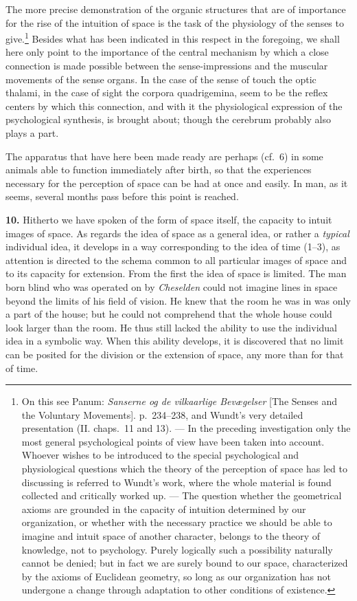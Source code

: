 \documentclass[12pt,a4paper]{book}
\newcommand{\opage}[1]{\marginnote{\footnotesize\textit{[#1]}}}
\begin{document}
The more precise demonstration of the organic structures that are of
importance for the rise of the intuition of space is the task of the
physiology of the senses to
give.\footnote{On this see Panum: \textit{Sanserne og de vilkaarlige
Bevægelser} [The Senses and the Voluntary Movements]. p.~234--238, and
Wundt's very detailed presentation (II. chaps.~11 and 13). --- In the
preceding investigation only the most general psychological points of
view have been taken into account. Whoever wishes to be introduced to
the special psychological and physiological questions which the theory of
the perception of space has led to discussing is referred to Wundt's
work, where the whole material is found collected and critically worked
up. --- The question whether the geometrical axioms are grounded in the
capacity of intuition determined by our organization, or whether with
the necessary practice we should be able to imagine and intuit space of
another character, belongs to the theory of knowledge, not to
psychology. Purely logically such a possibility naturally cannot be
denied; but in fact we are surely bound to our space, characterized by
the axioms of Euclidean geometry, so long as our organization has not
undergone a change through adaptation to other conditions of
existence.} Besides what has been indicated in this
\opage{250}respect in the foregoing, we shall here only point to the
importance of the central mechanism by which a close connection is made
possible between the sense-impressions and the muscular movements of the
sense organs. In the case of the sense of touch the optic thalami, in the
case of sight the corpora quadrigemina, seem to be the reflex centers by
which this connection, and with it the physiological expression of the
psychological synthesis, is brought about; though the cerebrum probably
also plays a part.

The apparatus that have here been made ready are perhaps (cf.\ 6) in some
animals able to function immediately after birth, so that the
experiences necessary for the perception of space can be had at once and
easily. In man, as it seems, several months pass before this point is
reached.

\textbf{10.} Hitherto we have spoken of the form of space itself, the
capacity to intuit images of space. As regards the idea of space as a
general idea, or rather a \emph{typical} individual idea, it develops in
a way corresponding to the idea of time (1--3), as attention is directed
to the schema common to all particular images of space and to its
capacity for extension. From the first the idea of space is limited. The
man born blind who was operated on by \emph{Cheselden} could not imagine
lines in space beyond the limits of his field of vision. He knew that the
room he was in was only a part of the house; but he could not comprehend
that the whole house could look larger than the room. He thus still
lacked the ability to use the individual idea in a symbolic way. When
this ability develops, it is discovered that no limit can be posited for
the division or the extension of space, any more than for that of time.
\end{document}

